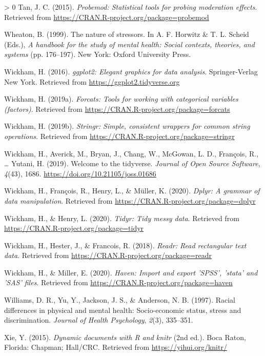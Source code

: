 \documentclass[
  english,
  man,floatsintext]{apa6}
\newlength{\cslhangindent}
\newenvironment{CSLReferences}[3] %
 {%
  \setlength{\parindent}{0pt}
  \ifodd #1 \everypar{\setlength{\hangindent}{\cslhangindent}}\ignorespaces\fi
  \ifnum #2 > 0
  \setlength{\parskip}{#2\baselineskip}
  \fi
 }%
 {}
\begin{document}
\begin{CSLReferences}{1}{0}
\leavevmode\hypertarget{ref-R-probemod}{}%
Tan, J. C. (2015). \emph{Probemod: Statistical tools for probing moderation effects}. Retrieved from \url{https://CRAN.R-project.org/package=probemod}

\leavevmode\hypertarget{ref-wheaton1999}{}%
Wheaton, B. (1999). The nature of stressors. In A. F. Horwitz \& T. L. Scheid (Eds.), \emph{A handbook for the study of mental health: Social contexts, theories, and systems} (pp. 176--197). New York: Oxford University Press.

\leavevmode\hypertarget{ref-R-ggplot2}{}%
Wickham, H. (2016). \emph{ggplot2: Elegant graphics for data analysis}. Springer-Verlag New York. Retrieved from \url{https://ggplot2.tidyverse.org}

\leavevmode\hypertarget{ref-R-forcats}{}%
Wickham, H. (2019a). \emph{Forcats: Tools for working with categorical variables (factors)}. Retrieved from \url{https://CRAN.R-project.org/package=forcats}

\leavevmode\hypertarget{ref-R-stringr}{}%
Wickham, H. (2019b). \emph{Stringr: Simple, consistent wrappers for common string operations}. Retrieved from \url{https://CRAN.R-project.org/package=stringr}

\leavevmode\hypertarget{ref-R-tidyverse}{}%
Wickham, H., Averick, M., Bryan, J., Chang, W., McGowan, L. D., François, R., \ldots{} Yutani, H. (2019). Welcome to the {tidyverse}. \emph{Journal of Open Source Software}, \emph{4}(43), 1686. \url{https://doi.org/10.21105/joss.01686}

\leavevmode\hypertarget{ref-R-dplyr}{}%
Wickham, H., François, R., Henry, L., \& Müller, K. (2020). \emph{Dplyr: A grammar of data manipulation}. Retrieved from \url{https://CRAN.R-project.org/package=dplyr}

\leavevmode\hypertarget{ref-R-tidyr}{}%
Wickham, H., \& Henry, L. (2020). \emph{Tidyr: Tidy messy data}. Retrieved from \url{https://CRAN.R-project.org/package=tidyr}

\leavevmode\hypertarget{ref-R-readr}{}%
Wickham, H., Hester, J., \& Francois, R. (2018). \emph{Readr: Read rectangular text data}. Retrieved from \url{https://CRAN.R-project.org/package=readr}

\leavevmode\hypertarget{ref-R-haven}{}%
Wickham, H., \& Miller, E. (2020). \emph{Haven: Import and export 'SPSS', 'stata' and 'SAS' files}. Retrieved from \url{https://CRAN.R-project.org/package=haven}

\leavevmode\hypertarget{ref-williams1997}{}%
Williams, D. R., Yu, Y., Jackson, J. S., \& Anderson, N. B. (1997). Racial differences in physical and mental health: Socio-economic status, stress and discrimination. \emph{Journal of Health Psychology}, \emph{2}(3), 335--351.

\leavevmode\hypertarget{ref-R-knitr}{}%
Xie, Y. (2015). \emph{Dynamic documents with {R} and knitr} (2nd ed.). Boca Raton, Florida: Chapman; Hall/CRC. Retrieved from \url{https://yihui.org/knitr/}

\end{CSLReferences}

\endgroup
\end{document}
